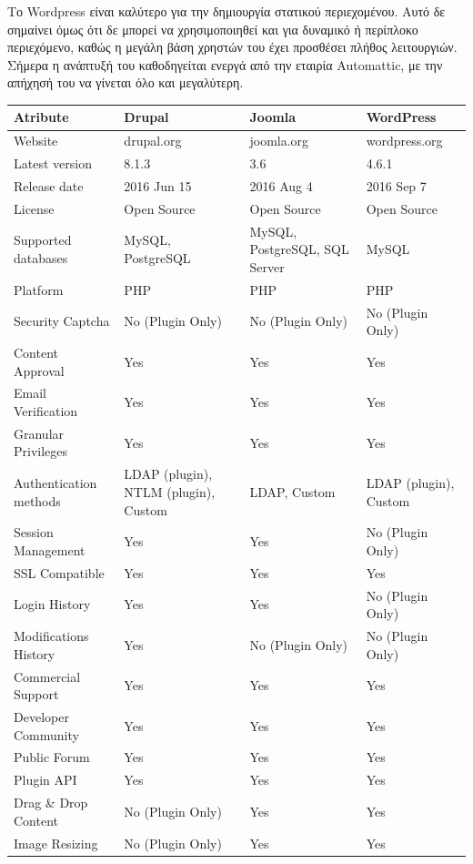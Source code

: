 \documentclass[12pt]{report}
\begin{document}
Το \textlatin{Wordpress} είναι καλύτερο για την δημιουργία στατικού περιεχομένου. Αυτό δε σημαίνει όμως ότι δε μπορεί να χρησιμοποιηθεί και για δυναμικό ή περίπλοκο περιεχόμενο, καθώς η μεγάλη βάση χρηστών του έχει προσθέσει πλήθος λειτουργιών. Σήμερα η ανάπτυξή του καθοδηγείται ενεργά από την εταιρία \textlatin{Automattic}, με την απήχησή του να γίνεται όλο και μεγαλύτερη.


\tiny
\begin{longtable}[H]{|| p{.3\linewidth} | p{.19\linewidth} | p{.19\linewidth} | p{.19\linewidth} ||}
\hline
\textbf{Atribute} & \textbf{Drupal} & \textbf{Joomla} & \textbf{WordPress} \\
\hline\hline \endhead
Website & drupal.org & joomla.org & wordpress.org \\
Latest version & 8.1.3 & 3.6 & 4.6.1 \\
Release date & 2016 Jun 15 & 2016 Aug 4 & 2016 Sep 7 \\
License & Open Source & Open Source & Open Source \\
Supported databases & MySQL, PostgreSQL & MySQL, PostgreSQL, SQL Server & MySQL \\
Platform & PHP & PHP & PHP \\
Security Captcha & No (Plugin Only) & No (Plugin Only) & No (Plugin Only) \\
Content Approval & Yes & Yes & Yes \\
Email Verification & Yes & Yes & Yes \\
Granular Privileges & Yes & Yes & Yes \\
Authentication methods & LDAP (plugin), NTLM (plugin), Custom & LDAP, Custom & LDAP (plugin), Custom \\
Session Management & Yes & Yes & No (Plugin Only) \\
SSL Compatible & Yes & Yes & Yes \\
Login History & Yes & Yes & No (Plugin Only) \\
Modifications History & Yes & No (Plugin Only) & No (Plugin Only) \\
Commercial Support & Yes & Yes & Yes \\
Developer Community & Yes & Yes & Yes \\
Public Forum & Yes & Yes & Yes \\
Plugin API & Yes & Yes & Yes \\
Drag \& Drop Content & No (Plugin Only) & Yes & Yes \\
Image Resizing & No (Plugin Only) & Yes & Yes \\

\end{longtable}
\end{document}
